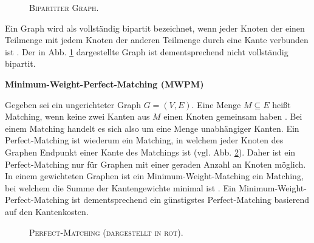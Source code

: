\begin{figure}[H]
\centering
{}
\caption{\textsc{Bipartiter Graph.}}
\label{fig:digression_bipartite_graph}
\end{figure}

Ein Graph wird als vollständig bipartit bezeichnet, wenn jeder Knoten der einen Teilmenge mit jedem Knoten
der anderen Teilmenge durch eine Kante verbunden ist \cite{Knust2019}. Der in Abb. \ref{fig:digression_bipartite_graph}
dargestellte Graph ist dementsprechend nicht vollständig bipartit.

\textbf{Minimum-Weight-Perfect-Matching (\textsc{MWPM})}

Gegeben sei ein ungerichteter Graph $G = (V, E)$. Eine Menge $M \subseteq E$ heißt Matching,
wenn keine zwei Kanten aus $M$ einen Knoten gemeinsam haben \cite{Gibbons1985}. Bei einem Matching handelt es sich also
um eine Menge unabhängiger Kanten. Ein Perfect-Matching ist wiederum ein Matching, in welchem jeder Knoten des Graphen
Endpunkt einer Kante des Matchings ist \cite{Gibbons1985} (vgl. Abb. \ref{fig:perfect_matching}).
Daher ist ein Perfect-Matching nur für Graphen mit einer geraden Anzahl an Knoten möglich.
In einem gewichteten Graphen ist ein Minimum-Weight-Matching ein Matching, bei welchem die Summe der Kantengewichte
minimal ist \cite{Gibbons1985}. Ein Minimum-Weight-Perfect-Matching ist dementsprechend ein günstigstes Perfect-Matching
basierend auf den Kantenkosten.

\begin{figure}[H]
\centering
{}
\caption{\textsc{Perfect-Matching (dargestellt in rot).}}
\label{fig:perfect_matching}
\end{figure}

